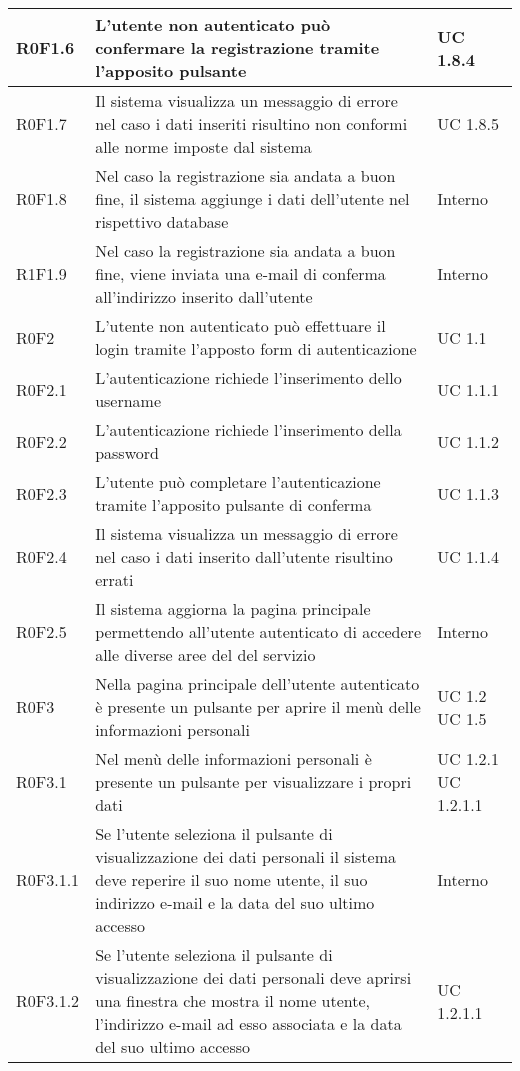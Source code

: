 \begin{center}
\begin{longtable}{| p{2cm} | p{8cm} | p{2cm} |}
		\hline
		R0F1.6  &  L'utente non autenticato può confermare la registrazione tramite l'apposito pulsante  &  UC 1.8.4 \\
		\hline
		R0F1.7  &  Il sistema visualizza un messaggio di errore nel caso i dati inseriti risultino non conformi alle norme imposte dal sistema  &  UC 1.8.5 \\
		\hline
		R0F1.8  &  Nel caso la registrazione sia andata a buon fine, il sistema aggiunge i dati dell'utente nel rispettivo database  &  Interno \\
		\hline
		R1F1.9  &  Nel caso la registrazione sia andata a buon fine, viene inviata una e-mail di conferma all'indirizzo inserito dall'utente  &  Interno \\
		\hline
		R0F2  &  L'utente non autenticato può effettuare il login tramite l'apposto form di autenticazione  &  UC 1.1 \\
		\hline
		R0F2.1  &  L'autenticazione richiede l'inserimento dello username  &  UC 1.1.1 \\
		\hline
		R0F2.2  &  L'autenticazione richiede l'inserimento della password  &  UC 1.1.2 \\
		\hline
		R0F2.3  &  L'utente può completare l'autenticazione tramite l'apposito pulsante di conferma  &  UC 1.1.3 \\
		\hline
		R0F2.4  &  Il sistema visualizza un messaggio di errore nel caso i dati inserito dall'utente risultino errati  &  UC 1.1.4 \\
		\hline
		R0F2.5  &  Il sistema aggiorna la pagina principale permettendo all'utente autenticato di accedere alle diverse aree del del servizio  &  Interno  \\
		\hline
		R0F3  &  Nella pagina principale dell'utente autenticato è presente un pulsante per aprire il menù delle informazioni personali  &  UC 1.2 \newline UC 1.5 \\
		\hline
		R0F3.1  &  Nel menù delle informazioni personali è presente un pulsante per visualizzare i propri dati  &  UC 1.2.1 \newline UC 1.2.1.1 \\
		\hline
		R0F3.1.1  &  Se l'utente seleziona il pulsante di visualizzazione dei dati personali il sistema deve reperire il suo nome utente, il suo indirizzo e-mail e la data del suo ultimo accesso &  Interno \\
		\hline
		R0F3.1.2  &  Se l'utente seleziona il pulsante di visualizzazione dei dati personali deve aprirsi una finestra che mostra il nome utente, l'indirizzo e-mail ad esso associata e la data del suo ultimo accesso &  UC 1.2.1.1 \\

\end{longtable}
\end{center}
